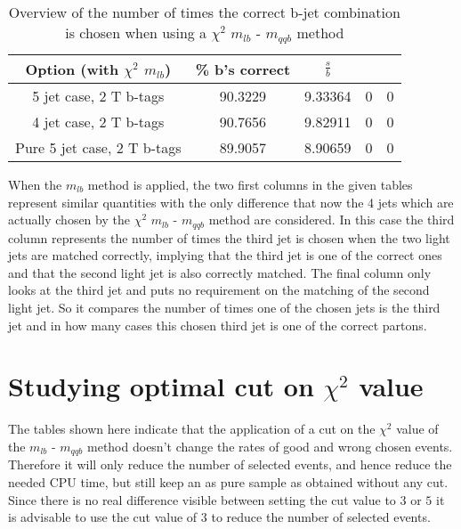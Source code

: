\documentclass[a4paper,12pt]{report}
\begin{document}
 \begin{table}[!h] 
 \begin{tabular}{c|c|c|c|c} 
 \textbf{Option} (with $\chi^{2}$ $m_{lb}$) & \% b's correct   & $\frac{s}{b}$ &  &  \\ \hline 
 5 jet case,      2 T b-tags              & 90.3229 & 9.33364 & 0 & 0 \\ 
 4 jet case,      2 T b-tags              & 90.7656 & 9.82911 & 0 & 0 \\ 
 Pure 5 jet case, 2 T b-tags              & 89.9057 & 8.90659 & 0 & 0 \\ 
 \end{tabular} 
 \caption{Overview of the number of times the correct b-jet combination is chosen when using a $\chi^{2}$ $m_{lb}$ - $m_{qqb}$ method} 
 \end{table} 
When the $m_{lb}$ method is applied, the two first columns in the given tables represent similar quantities with the only difference that now the 4 jets which are actually chosen by the $\chi^{2}$ $m_{lb}$ - $m_{qqb}$ method are considered. 
In this case the third column represents the number of times the third jet is chosen when the two light jets are matched correctly, implying that the third jet is one of the correct ones and that the second light jet is also correctly matched. The final column only looks at the third jet and puts no requirement on the matching of the second light jet. So it compares the number of times one of the chosen jets is the third jet and in how many cases this chosen third jet is one of the correct partons.
 
\section{Studying optimal cut on $\chi^{2}$ value}
The tables shown here indicate that the application of a cut on the $\chi^{2}$ value of the $m_{lb}$ - $m_{qqb}$ method doesn't change the rates of good and wrong chosen events. Therefore it will only reduce the number of selected events, and hence reduce the needed CPU time, but still keep an as pure sample as obtained without any cut.\\
Since there is no real difference visible between setting the cut value to $3$ or $5$ it is advisable to use the cut value of $3$ to reduce the number of selected events.
 
\end{document}
